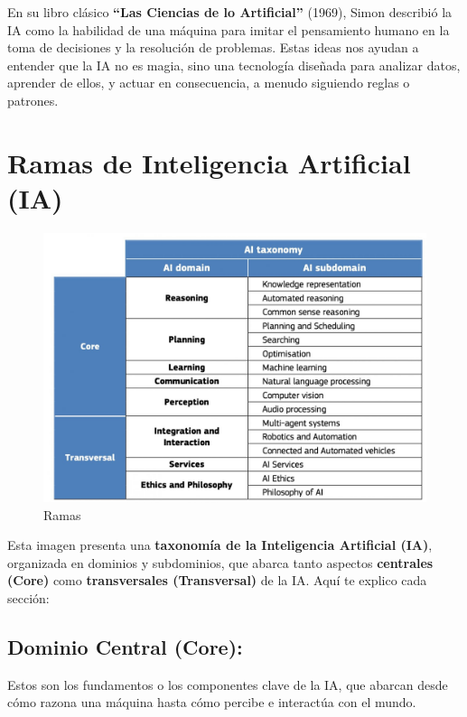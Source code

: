\documentclass[
  10pt,
  letterpaper,
]{book}
\begin{document}
En su libro clásico \textbf{``Las Ciencias de lo Artificial''} (1969),
Simon describió la IA como la habilidad de una máquina para imitar el
pensamiento humano en la toma de decisiones y la resolución de
problemas. Estas ideas nos ayudan a entender que la IA no es magia, sino
una tecnología diseñada para analizar datos, aprender de ellos, y actuar
en consecuencia, a menudo siguiendo reglas o patrones.

\section{Ramas de Inteligencia Artificial
(IA)}\label{ramas-de-inteligencia-artificial-ia}

\begin{figure}[H]

{\centering \includegraphics{Img/taxonomia.jpg}

}

\caption{Ramas}

\end{figure}%

Esta imagen presenta una \textbf{taxonomía de la Inteligencia Artificial
(IA)}, organizada en dominios y subdominios, que abarca tanto aspectos
\textbf{centrales (Core)} como \textbf{transversales (Transversal)} de
la IA. Aquí te explico cada sección:

\subsection{Dominio Central (Core):}\label{dominio-central-core}

Estos son los fundamentos o los componentes clave de la IA, que abarcan
desde cómo razona una máquina hasta cómo percibe e interactúa con el
mundo.
\end{document}
